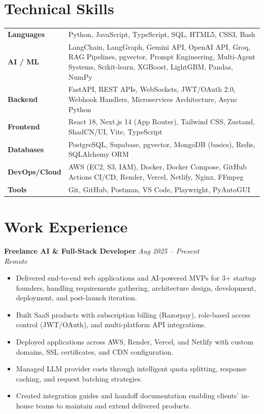 \documentclass[11pt]{article}
\begin{document}
\section*{Technical Skills}

\begin{tabularx}{\textwidth}{@{} p{2.6cm} X @{}}
\textbf{Languages}     & Python, JavaScript, TypeScript, SQL, HTML5, CSS3, Bash \\[3pt]
\textbf{AI / ML}       & LangChain, LangGraph, Gemini API, OpenAI API, Groq, RAG Pipelines, pgvector, Prompt Engineering, Multi-Agent Systems, Scikit-learn, XGBoost, LightGBM, Pandas, NumPy \\[3pt]
\textbf{Backend}       & FastAPI, REST APIs, WebSockets, JWT/OAuth 2.0, Webhook Handlers, Microservices Architecture, Async Python \\[3pt]
\textbf{Frontend}      & React 18, Next.js 14 (App Router), Tailwind CSS, Zustand, ShadCN/UI, Vite, TypeScript \\[3pt]
\textbf{Databases}     & PostgreSQL, Supabase, pgvector, MongoDB (basics), Redis, SQLAlchemy ORM \\[3pt]
\textbf{DevOps/Cloud}  & AWS (EC2, S3, IAM), Docker, Docker Compose, GitHub Actions CI/CD, Render, Vercel, Netlify, Nginx, FFmpeg \\[3pt]
\textbf{Tools}         & Git, GitHub, Postman, VS Code, Playwright, PyAutoGUI \\
\end{tabularx}

\section*{Work Experience}

\textbf{Freelance AI \& Full-Stack Developer} \hfill \textit{Aug 2025 -- Present} \\
\textit{Remote}
\begin{itemize}
  \item Delivered end-to-end web applications and AI-powered MVPs for 3+ startup founders, handling requirements gathering, architecture design, development, deployment, and post-launch iteration.
  \item Built SaaS products with subscription billing (Razorpay), role-based access control (JWT/OAuth), and multi-platform API integrations.
  \item Deployed applications across AWS, Render, Vercel, and Netlify with custom domains, SSL certificates, and CDN configuration.
  \item Managed LLM provider costs through intelligent quota splitting, response caching, and request batching strategies.
  \item Created integration guides and handoff documentation enabling clients' in-house teams to maintain and extend delivered products.
\end{itemize}
\end{document}
